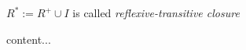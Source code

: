 \begin{definition}
$R^{*} := R^{+} \cup I$
is called \textit{reflexive-transitive closure}
\end{definition}

\begin{definition}
content...
\end{definition}